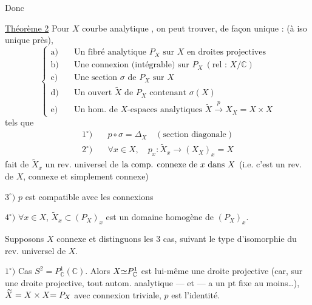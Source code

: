 Donc

\uline{Théorème 2} Pour $X$ courbe analytique , on peut trouver, de façon unique :
(à iso unique près),
\[
\left\{\begin{aligned}
\text{a)}\quad&\text{Un fibré analytique }P_X\text{ sur }X\text{ en droites projectives}\\
\text{b)}\quad&\text{Une connexion (intégrable) sur }P_X\ (\text{rel : }X/\mathbb C)\\
\text{c)}\quad&\text{Une section }\sigma\text{ de }P_X\text{ sur }X\\
\text{d)}\quad&\text{Un ouvert }\widetilde X\text{ de }P_X\text{ contenant }\sigma(X)\\
\text{e)}\quad&\text{Un hom. de }X\text{-espaces analytiques }\widetilde X\xrightarrow{p}X_X=X\times X
\end{aligned}\right.
\]
tels que
\[
\begin{aligned}
1^\circ)\quad&p\circ\sigma=\Delta_X\quad(\text{section diagonale})\\
2^\circ)\quad&\forall x\in X,\quad p_x:\widetilde X_x\longrightarrow(X_X)_x=X
\end{aligned}
\]
fait de $\widetilde X_x$ un rev. universel de ${\text{la comp. connexe de }x\text{ dans }}X$ (i.e. c'est un rev. de $X$, connexe et simplement connexe)

$3^\circ)$ $p$ est compatible avec les connexions

$4^\circ)$ $\forall x\in X$, $\widetilde X_x\subset(P_X)_x$ est un domaine homogène de $(P_X)_x$.

Supposons $X$ connexe et distinguons les 3 cas, suivant le type d'isomorphie du rev. universel de $X$.

$1^\circ)$ Cas $S^2=P^1_{\mathbb C}(\mathbb C)$. Alors $X{\simeq}P^1_{\mathbb C}$ est lui-même une droite projective (car, sur une droite projective, tout autom. analytique --- et  --- a un pt fixe au moins\ldots), $\widetilde X=X\times X{=P_X}$ avec connexion triviale, $p$ est l'identité.

